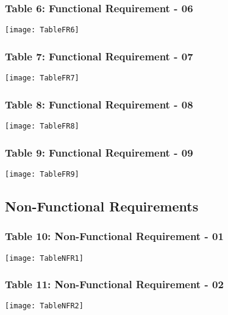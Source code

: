\begin{figure}[h]
\subsubsection{Table 6: Functional Requirement - 06}
\centering
\texttt{[image: TableFR6]}
\end{figure}

\begin{figure}[h]
\subsubsection{Table 7: Functional Requirement - 07}
\centering
\texttt{[image: TableFR7]}
\end{figure}

\begin{figure}[h]
\subsubsection{Table 8: Functional Requirement - 08}
\centering
\texttt{[image: TableFR8]}
\end{figure}

\begin{figure}[h]
\subsubsection{Table 9: Functional Requirement - 09}
\centering
\texttt{[image: TableFR9]}
\end{figure}

\begin{figure}[h]
\subsection{Non-Functional Requirements} 
\bigskip
\bigskip
\subsubsection{Table 10: Non-Functional Requirement - 01}
\centering
\texttt{[image: TableNFR1]}
\end{figure}

\begin{figure}[h]
\subsubsection{Table 11: Non-Functional Requirement - 02}
\centering
\texttt{[image: TableNFR2]}
\end{figure}


